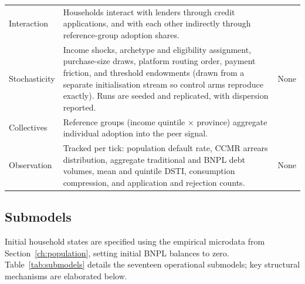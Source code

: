 \begin{longtable}{L{2.9cm}L{7.3cm}L{3.2cm}}
\addlinespace
Interaction & Households interact with lenders through credit applications, and with each other indirectly through reference-group adoption shares. & \cite{ackert2025bnpl} \\
\pagebreak
Stochasticity & Income shocks, archetype and eligibility assignment, purchase-size draws, platform routing order, payment friction, and threshold endowments (drawn from a separate initialisation stream so control arms reproduce exactly). Runs are seeded and replicated, with dispersion reported. & None \\
\addlinespace
Collectives & Reference groups (income quintile $\times$ province) aggregate individual adoption into the peer signal. & \cite{cardaci2018inequality} \\
\addlinespace
Observation & Tracked per tick: population default rate, \ac{CCMR} arrears distribution, aggregate traditional and \ac{BNPL} debt volumes, mean and quintile \ac{DSTI}, consumption compression, and application and rejection counts. & None \\
\end{longtable}

\subsection{Submodels}
\label{sec:submodels}

Initial household states are specified using the empirical microdata from Section~\ref{ch:population}, setting initial \ac{BNPL} balances to zero.
Table~\ref{tab:submodels} details the seventeen operational submodels; key structural mechanisms are elaborated below.

